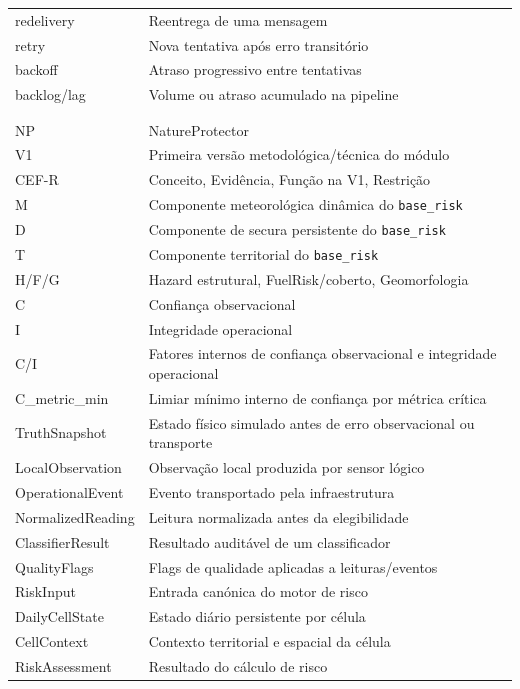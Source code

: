 \begin{longtable}{@{}>{\raggedright\arraybackslash}p{}>{\raggedright\arraybackslash}p{}@{}}
redelivery & Reentrega de uma mensagem \\
retry & Nova tentativa após erro transitório \\
backoff & Atraso progressivo entre tentativas \\
backlog/lag & Volume ou atraso acumulado na pipeline \\
\multicolumn{2}{l}{} \\[-0.7em]
\multicolumn{2}{l}{\textbf{Artefactos e símbolos internos NatureProtector}} \\
NP & NatureProtector \\
V1 & Primeira versão metodológica/técnica do módulo \\
CEF-R & Conceito, Evidência, Função na V1, Restrição \\
M & Componente meteorológica dinâmica do \texttt{base\_risk} \\
D & Componente de secura persistente do \texttt{base\_risk} \\
T & Componente territorial do \texttt{base\_risk} \\
H/F/G & Hazard estrutural, FuelRisk/coberto, Geomorfologia \\
C & Confiança observacional \\
I & Integridade operacional \\
C/I & Fatores internos de confiança observacional e integridade operacional \\
C\_metric\_min & Limiar mínimo interno de confiança por métrica crítica \\
TruthSnapshot & Estado físico simulado antes de erro observacional ou transporte \\
LocalObservation & Observação local produzida por sensor lógico \\
OperationalEvent & Evento transportado pela infraestrutura \\
NormalizedReading & Leitura normalizada antes da elegibilidade \\
ClassifierResult & Resultado auditável de um classificador \\
QualityFlags & Flags de qualidade aplicadas a leituras/eventos \\
RiskInput & Entrada canónica do motor de risco \\
DailyCellState & Estado diário persistente por célula \\
CellContext & Contexto territorial e espacial da célula \\
RiskAssessment & Resultado do cálculo de risco \\

\end{longtable}
